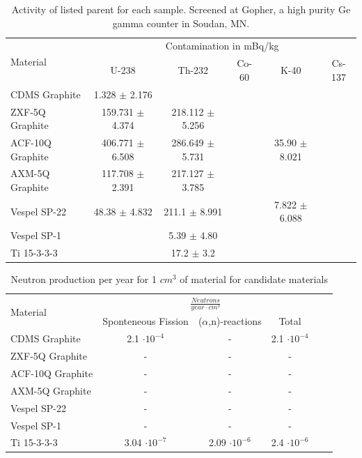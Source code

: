 \documentclass{report}
\begin{document}
\begin{table}[htb]
\centering
\begin{threeparttable}
\begin{tabular}{l|ccccc}
\multirow{2}{*}{\large{Material}} & \multicolumn{5}{c}{Contamination in mBq/kg}\\
& U-238 & Th-232 & Co-60 & K-40 & Cs-137 \\\toprule
CDMS Graphite & 1.328 $\pm$ 2.176 & & & & \\
ZXF-5Q Graphite & 159.731 $\pm$ 4.374 & 218.112 $\pm$ 5.256 &  &  &  \\
ACF-10Q Graphite & 406.771 $\pm$ 6.508 & 286.649 $\pm$ 5.731 & & 35.90 $\pm$ 8.021 &\\
AXM-5Q Graphite & 117.708 $\pm$ 2.391 & 217.127 $\pm$ 3.785 & & &  \\
Vespel SP-22 & 48.38 $\pm$ 4.832 & 211.1 $\pm$ 8.991 & & 7.822 $\pm$ 6.088 &\\
Vespel SP-1 & & 5.39 $\pm$ 4.80 & & &  \\
Ti 15-3-3-3 & & 17.2 $\pm$ 3.2 & & &  \\

\end{tabular}
\caption{Activity of listed parent for each sample. Screened at Gopher, a high purity Ge
gamma counter in Soudan, MN.}
\end{threeparttable}
\end{table}

\begin{table}[htb]
\centering
\begin{threeparttable}
\begin{tabular}{l|ccccc}
\multirow{2}{*}{\large{Material}} & \multicolumn{3}{c}{$\frac{Neutrons}{year \cdot cm^{3}}$}\\
& Sponteneous Fission & ($\alpha$,n)-reactions & Total \\\toprule
CDMS Graphite & 2.1 $\cdot 10^{-4}$ & - & 2.1 $\cdot 10^{-4}$ \\
ZXF-5Q Graphite & - & - & - \\
ACF-10Q Graphite & - & - & - \\
AXM-5Q Graphite & - & - & - \\
Vespel SP-22 & - & - & - \\
Vespel SP-1 & - & - & - \\
Ti 15-3-3-3 & 3.04 $\cdot 10^{-7}$ & 2.09 $\cdot 10^{-6}$ & 2.4 $\cdot 10^{-6}$ \\

\end{tabular}
\caption{Neutron production per year for 1 $cm^{3}$ of material for candidate materials}
\end{threeparttable}
\end{table}
\end{document}
